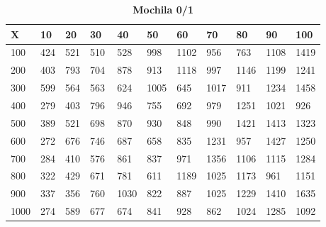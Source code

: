 \documentclass[10pt,letterpaper]{article}
\begin{document}
\newpage 
{}
\begin{center}
\begin{table}\renewcommand{\arraystretch}{2.5}
\caption{\large \textbf{Mochila 0/1}}
\centering
\begin{tabular} { |m{0.5cm}|m{1.3cm}|m{1.3cm}|m{1.3cm}|m{1.3cm}|m{1.3cm}|m{1.3cm}|m{1.3cm}|m{1.3cm}|m{1.3cm}|m{1.3cm}|} 
\hline
\rowcolor{Gray}
\centering \textbf{X} & \centering \textbf{10} & \centering \textbf{20} & \centering \textbf{30}\ & \centering \textbf{40} & \centering \textbf{50} & \centering \textbf{60}\ & \centering \textbf{70} & \centering \textbf{80} & \centering \textbf{90}\ & \textbf{100} \\\hline
\cellcolor{Gray}100 & \Large 424 & \Large 521 & \Large 510 & \Large 528 & \Large 998 & \Large 1102 & \Large 956 & \Large 763 & \Large 1108 & \Large 1419 \\
\hline
\cellcolor{Gray}200 & \Large 403 & \Large 793 & \Large 704 & \Large 878 & \Large 913 & \Large 1118 & \Large 997 & \Large 1146 & \Large 1199 & \Large 1241 \\
\hline
\cellcolor{Gray}300 & \Large 599 & \Large 564 & \Large 563 & \Large 624 & \Large 1005 & \Large 645 & \Large 1017 & \Large 911 & \Large 1234 & \Large 1458 \\
\hline
\cellcolor{Gray}400 & \Large 279 & \Large 403 & \Large 796 & \Large 946 & \Large 755 & \Large 692 & \Large 979 & \Large 1251 & \Large 1021 & \Large 926 \\
\hline
\cellcolor{Gray}500 & \Large 389 & \Large 521 & \Large 698 & \Large 870 & \Large 930 & \Large 848 & \Large 990 & \Large 1421 & \Large 1413 & \Large 1323 \\
\hline
\cellcolor{Gray}600 & \Large 272 & \Large 676 & \Large 746 & \Large 687 & \Large 658 & \Large 835 & \Large 1231 & \Large 957 & \Large 1427 & \Large 1250 \\
\hline
\cellcolor{Gray}700 & \Large 284 & \Large 410 & \Large 576 & \Large 861 & \Large 837 & \Large 971 & \Large 1356 & \Large 1106 & \Large 1115 & \Large 1284 \\
\hline
\cellcolor{Gray}800 & \Large 322 & \Large 429 & \Large 671 & \Large 781 & \Large 611 & \Large 1189 & \Large 1025 & \Large 1173 & \Large 961 & \Large 1151 \\
\hline
\cellcolor{Gray}900 & \Large 337 & \Large 356 & \Large 760 & \Large 1030 & \Large 822 & \Large 887 & \Large 1025 & \Large 1229 & \Large 1410 & \Large 1635 \\
\hline
\cellcolor{Gray}1000 & \Large 274 & \Large 589 & \Large 677 & \Large 674 & \Large 841 & \Large 928 & \Large 862 & \Large 1024 & \Large 1285 & \Large 1092 \\
\hline
\end{tabular} \\
\end{table}
\end{center}
\end{document}
